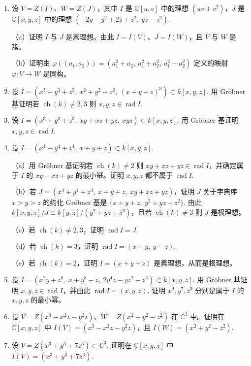 \begin{enumerate}
\item 设 \(V = Z(I)\)、\(W = Z(J)\)，其中 \(I\) 是 \(\mathbb{C}[u,v]\) 中的理想 \((uv+v^2)\)，\(J\) 是 \(\mathbb{C}[x,y,z]\) 中的理想 \((-2y-y^2+2z+z^2,\ yz-z^2)\).

（a）证明 \(I\) 与 \(J\) 是素理想。由此 \(I = I(V)\)、\(J = I(W)\)，且 \(V\) 与 \(W\) 是簇。

（b）证明由 \(\varphi((a_1, a_2)) = (a_1^2+a_2,\ a_1^2+a_2^2,\ a_1^2-a_2^2)\) 定义的映射 \(\varphi : V \to W\) 是同构。

\item 设 \(I = (x^3+y^3+z^3,\ x^2+y^2+z^2,\ (x+y+z)^3) \subset k[x,y,z]\). 用 Gröbner 基证明若 \(\operatorname{ch}(k) \neq 2, 3\) 则 \(x, y, z \in \operatorname{rad}I\).

\item 设 \(I = (x^3+y^3+z^3,\ xy+xz+yz,\ xyz) \subset k[x,y,z]\). 用 Gröbner 基证明 \(x, y, z \in \operatorname{rad}I\).

\item 设 \(I = (x^4+y^4+z^4,\ x+y+z) \subset k[x,y,z]\).

（a）用 Gröbner 基证明若 \(\operatorname{ch}(k) \neq 2\) 则 \(xy+xz+yz \in \operatorname{rad}I\)，并确定属于 \(I\) 的 \(xy+xz+yz\) 的最小幂。证明 \(x, y, z\) 都不属于 \(\operatorname{rad}I\).

（b）若 \(J = (x^4+y^4+z^4,\ x+y+z,\ xy+xz+yz)\)，证明 \(J\) 关于字典序 \(x > y > z\) 的约化 Gröbner 基是 \(\{x+y+z,\ y^2+yz+z^2\}\). 由此 \(k[x,y,z]/J \cong k[y,z]/(y^2+yz+z^2)\)，且若 \(\operatorname{ch}(k) \neq 3\) 则 \(J\) 是根理想。

（c）若 \(\operatorname{ch}(k) \neq 2, 3\)，证明 \(\operatorname{rad}I = J\).

（d）若 \(\operatorname{ch}(k) = 3\)，证明 \(\operatorname{rad}I = (x-y,\ y-z)\).

（e）若 \(\operatorname{ch}(k) = 2\)，证明 \(I = (x+y+z)\) 是素理想，从而是根理想。

\item 设 \(I = (x^2y+z^3,\ x+y^3-z,\ 2y^4z-yz^2-z^3) \subset k[x,y,z]\). 用 Gröbner 基证明 \(x, y, z \in \operatorname{rad}I\)，并由此 \(\operatorname{rad}I = (x,y,z)\). 证明 \(x^9, y^7, z^9\) 分别是属于 \(I\) 的 \(x, y, z\) 的最小幂。

\item 设 \(V = Z(x^3-x^2z-y^2z)\)、\(W = Z(x^2+y^2-z^2)\) 在 \(\mathbb{C}^3\) 中。证明在 \(\mathbb{C}[x,y,z]\) 中 \(I(V) = (x^3-x^2z-y^2z)\)，且 \(I(W) = (x^2+y^2-z^2)\).

\item 设 \(V = Z(x^3+y^3+7z^3) \subset \mathbb{C}^3\). 证明在 \(\mathbb{C}[x,y,z]\) 中 \(I(V) = (x^3+y^3+7z^3)\).


\end{enumerate}
